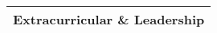 \Large
\begin{tabularx}{\linewidth}{@{}l}
    Extracurricular \& Leadership \\
    \hline
\end{tabularx}
\normalsize